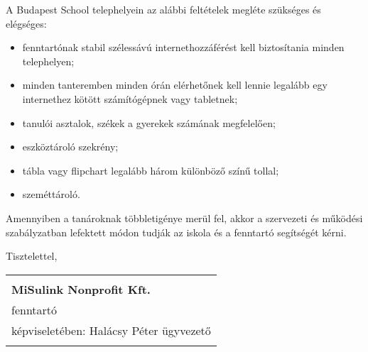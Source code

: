 \documentclass{article}
\providecommand{\tightlist}{%
  \setlength{\itemsep}{0pt}\setlength{\parskip}{0pt}}
\begin{document}
A Budapest School telephelyein az alábbi feltételek megléte szükséges és
elégséges:

\begin{itemize}
\tightlist
\item
  fenntartónak stabil szélessávú internethozzáférést kell biztosítania
  minden telephelyen;
\item
  minden tanteremben minden órán elérhetőnek kell lennie legalább egy
  internethez kötött számítógépnek vagy tabletnek;
\item
  tanulói asztalok, székek a gyerekek számának megfelelően;
\item
  eszköztároló szekrény;
\item
  tábla vagy flipchart legalább három különböző színű tollal;
\item
  szeméttároló.
\end{itemize}

Amennyiben a tanároknak többletigénye merül fel, akkor a szervezeti és
működési szabályzatban lefektett módon tudják az iskola és a fenntartó
segítségét kérni.



\vspace{0.75cm}
\noindent
Tisztelettel,

\vspace{0.75cm}
\noindent
\begin{center}
      \begin{tabular}{p{8cm}}
            \begin{center}
                  \hrulefill \\
                  \textbf{MiSulink Nonprofit Kft.} \\
                  fenntartó\\
                  képviseletében: Halácsy Péter ügyvezető \\
            \end{center}
      \end{tabular}
\end{center}
\end{document}

